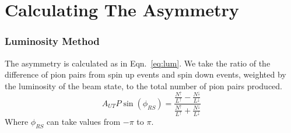\documentclass[letterpaper, abstract = on,listof=totoc, bibliography=totoc]{scrreprt}
\newcommand{\phir}{\phi_{R}}
\newcommand{\phis}{\phi_{S}}
\begin{document}
%
%

\FloatBarrier
\section{Calculating The Asymmetry}




\subsubsection{Luminosity Method}

The asymmetry is calculated as in Eqn.~\ref{eq:lum}. We take the ratio of the difference of pion pairs from spin up events and spin down events, weighted by the luminosity of the beam state, to the total number of pion pairs produced.
\begin{equation}
A_{UT}P\sin\left(\phi_{RS}\right) = \frac{\frac{N^\uparrow}{L^\uparrow} - \frac{N^\downarrow}{L^\downarrow}} {\frac{N^\uparrow}{L^\uparrow} + \frac{N^\downarrow}{L^\downarrow}}
\label{eq:lum}
\end{equation}
Where $\phi_{RS}$ can take values from $-\pi$ to $\pi$.
\end{document}
